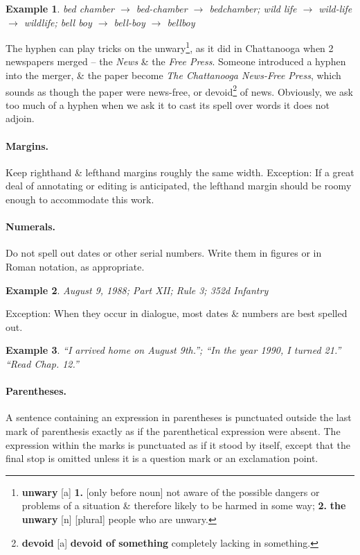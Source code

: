 \documentclass[oneside]{book}
\numberwithin{equation}{section}
\newtheorem{example}{Example}[chapter]
\begin{document}
\begin{example}
	bed chamber $\to$ bed-chamber $\to$ bedchamber; wild life $\to$ wild-life $\to$ wildlife; bell boy $\to$ bell-boy $\to$ bellboy
\end{example}
The hyphen can play tricks on the unwary\footnote{\textbf{unwary} [a] \textbf{1.} [only before noun] not aware of the possible dangers or problems of a situation \& therefore likely to be harmed in some way; \textbf{2.} \textbf{the unwary} [n] [plural] people who are unwary.}, as it did in Chattanooga when 2 newspapers merged -- the \textit{News} \& the \textit{Free Press}. Someone introduced a hyphen into the merger, \& the paper become \textit{The Chattanooga News-Free Press}, which sounds as though the paper were news-free, or devoid\footnote{\textbf{devoid} [a] \textbf{devoid of something} completely lacking in something.} of news. Obviously, we ask too much of a hyphen when we ask it to cast its spell over words it does not adjoin.

\paragraph*{Margins.} Keep righthand \& lefthand margins roughly the same width. Exception: If a great deal of annotating or editing is anticipated, the lefthand margin should be roomy enough to accommodate this work.

\paragraph*{Numerals.} Do not spell out dates or other serial numbers. Write them in figures or in Roman notation, as appropriate.

\begin{example}
	August 9, 1988; Part XII; Rule 3; 352d Infantry
\end{example}
Exception: When they occur in dialogue, most dates \& numbers are best spelled out.

\begin{example}
	``I arrived home on August 9th.''; ``In the year 1990, I turned 21.'' ``Read Chap. 12.''
\end{example}

\paragraph*{Parentheses.} A sentence containing an expression in parentheses is punctuated outside the last mark of parenthesis exactly as if the parenthetical expression were absent. The expression within the marks is punctuated as if it stood by itself, except that the final stop is omitted unless it is a question mark or an exclamation point.
\end{document}
